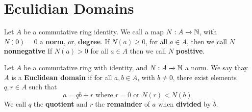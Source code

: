\section{Eculidian Domains}

\begin{definition}
    Let $A$ be a commutative ring identity. We call a map  $N:A \xrightarrow{} \mathbb{N}$,
    with $N(0)=0$ a \textbf{norm}, or, \textbf{degree}. If $N(a) \geq 0$, for all
    $a \in A$, then we call $N$ \textbf{nonnegative} If $N(a)>0$ for all $a \in A$
    then we call  $N$ \textbf{positive}.
\end{definition}

\begin{definition}
    Let $A$ be a commutative ring with identity, and  $N:A \xrightarrow{} \mathbb{N}$ a
    norm. We say thay $A$ is a \textbf{Euclidean domain} if for all $a,b \in A$,
    with $b \neq 0$, there exist elements  $q,r \in A$ such that
    \begin{equation*}
        a=qb+r \text{ where } r=0 \text{ or } N(r)<N(b)
    \end{equation*}
    We call $q$ the  \textbf{quotient} and $r$ the  \textbf{remainder} of $a$
    when  \textbf{divided} by $b$.
\end{definition}

